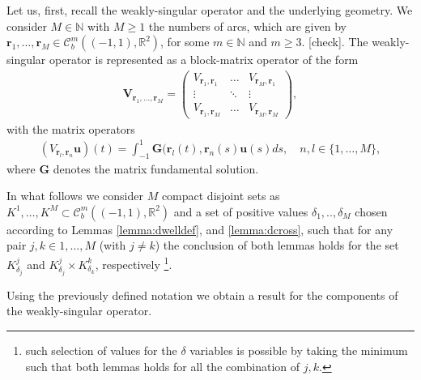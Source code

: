 \documentclass{article}
\newcommand{\todo}[1]{{\color{red}[#1]}}
\newcommand{\IN}{{\mathbb N}}
\newcommand{\IR}{{\mathbb R}}
\newcommand{\rgeo}[1]{\mathcal{C}_b^{#1}\left( (-1,1), \IR^2 \right)}
\newcommand{\bu}{\bm{u}}
\newcommand{\br}{\bm{r}}
\begin{document}
Let us, first, recall the weakly-singular operator and the underlying geometry. We consider $M \in \IN$ with $M\geq 1$ the numbers of arcs, which are given by $\br_1,\hdots, \br_M \in \rgeo{m}$, for some $m \in \IN$ and $m \geq 3$. \todo{check}.  The weakly-singular operator is represented as a block-matrix operator of the form 
\begin{align*}
\mathbf{V}_{\br_1,\hdots, \br_M}  = \begin{pmatrix}
V_{\br_1,\br_1}& \hdots & V_{\br_M,\br_1} \\
\vdots& \ddots & \vdots \\
V_{\br_1, \br_M} & \hdots & V_{\br_M,\br_M}
\end{pmatrix}, 
\end{align*}
with the matrix operators  
\begin{align*}
(V_{\br_l, \br_n}\bu)(t) = \int_{-1}^1 \mathbf{G}(\br_l(t), \br_n(s) \bu(s) ds , \quad n,l \in \{1,\hdots,M\}, 
\end{align*}
where $\mathbf{G}$ denotes the matrix fundamental solution. 

In what follows we consider $M$ compact disjoint sets as $K^1,\hdots,K^M \subset \rgeo{m}$ and a set of positive values $\delta_1, ..,\delta_M$ chosen according to Lemmas \ref{lemma:dwelldef}, and \ref{lemma:dcross}, such that for any pair $j,k \in 1,\hdots,M$ (with $j\neq k$) the conclusion of both lemmas holds for the set $K^j_{\delta_j}$ and $ K^j_{\delta_j}\times K^k_{\delta_k}$, respectively \footnote{such selection of values for the $\delta$ variables is possible by taking the minimum such that both lemmas holds for all the combination of $j,k$. }. 

Using the previously defined notation we obtain a result for the components of the weakly-singular operator. 
\end{document}
